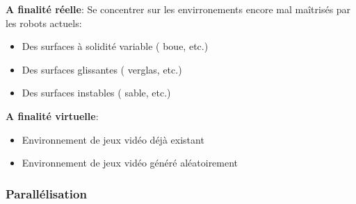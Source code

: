 \documentclass[journal, a4paper]{IEEEtran}
\begin{document}
	\textbf{A finalité réelle}:
	Se concentrer sur les envirronements encore mal maîtrisés par les
	robots actuels:
	\begin{itemize}
			\item Des surfaces à solidité variable ( boue, etc.)
			\item Des surfaces glissantes ( verglas, etc.)
			\item Des surfaces instables ( sable, etc.)
		\end{itemize}
	\textbf{A finalité virtuelle}:
	\begin{itemize}
			\item Environnement de jeux vidéo déjà existant
			\item Environnement de jeux vidéo généré aléatoirement
			\end{itemize}

\subsubsection{Parallélisation}

\end{document}

